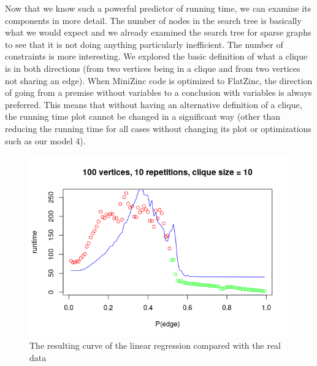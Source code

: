 \documentclass{article}
\theoremstyle{definition}
\begin{document}
Now that we know such a powerful predictor of running time, we can examine its components in more detail. The number of nodes in the search tree is basically what we would expect and we already examined the search tree for sparse graphs to see that it is not doing anything particularly inefficient. The number of constraints is more interesting. We explored the basic definition of what a clique is in both directions (from two vertices being in a clique and from two vertices not sharing an edge). When MiniZinc code is optimized to FlatZinc, the direction of going from a premise without variables to a conclusion with variables is always preferred. This means that without having an alternative definition of a clique, the running time plot cannot be changed in a significant way (other than reducing the running time for all cases without changing its plot or optimizations such as our model 4).
\begin{figure}
  \includegraphics[scale=0.5]{regression.png}
  \caption{The resulting curve of the linear regression compared with the real data}
  \label{fig:regression}
\end{figure}
\end{document}
